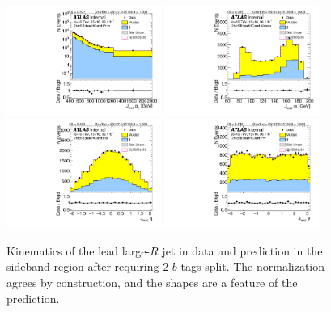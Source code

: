 \clearpage

\begin{figure}[htbp!]
\begin{center}
\includegraphics[angle=270, width=0.45\textwidth]{./figures/boosted/Sideband/b77_TwoTag_split_Sideband_leadHCand_Pt_m_1.pdf}
\includegraphics[angle=270, width=0.45\textwidth]{./figures/boosted/Sideband/b77_TwoTag_split_Sideband_leadHCand_Mass_s.pdf}\\
\includegraphics[angle=270, width=0.45\textwidth]{./figures/boosted/Sideband/b77_TwoTag_split_Sideband_leadHCand_Eta.pdf}
\includegraphics[angle=270, width=0.45\textwidth]{./figures/boosted/Sideband/b77_TwoTag_split_Sideband_leadHCand_Phi.pdf}
  \caption{Kinematics of the lead large-$R$ jet in data and prediction in the sideband region after requiring 2 $b$-tags split. The normalization agrees by construction, and the shapes are a feature of the prediction.}
  \label{fig:boosted-2bs-sideband-ak10-lead}
\end{center}
\end{figure}

